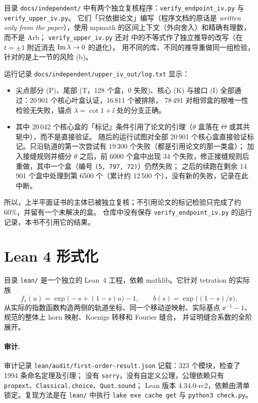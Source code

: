 目录 \texttt{docs/independent/} 中有两个独立复核程序：\texttt{verify\_\allowbreak{}endpoint\_\allowbreak{}iv.py} 与 \texttt{verify\_\allowbreak{}upper\_\allowbreak{}iv.py}。
它们「只依据论文」编写（程序文档的原话是 \emph{written only from the paper}），使用 mpmath 的区间上下文（外向舍入）和精确有理数，而不是 Arb；
\texttt{verify\_\allowbreak{}upper\_\allowbreak{}iv.py} 还对 \cite{KneserPaper} 中的不等式作了独立推导的改写（在 $t=\pm1$ 附近消去 $\operatorname{Im}\lambda\to0$ 的退化）。
用不同的库、不同的推导重做同一组检验，针对的是上一节的风险 (b)。

运行记录 \texttt{docs/independent/upper\_\allowbreak{}iv\_\allowbreak{}out/log.txt} 显示：
\begin{itemize}
\item 尖点部分 (P)、尾部 (T，128 个盒，0 失败)、核心 (K) 与接口 (I) 全部通过：20\,901 个核心叶盒认证，16\,811 个被排除，
  78\,491 对相邻盒的根唯一性检验无失败，锚点 $\lambda=\cot1+\ii$ 处的分支正确。
\item 其中 20\,042 个核心盒的「标记」条件引用了论文的引理（$\theta$ 盒落在 $\Theta$ 或其共轭中），而不是直接验证。
  随后的运行试图对全部 20\,901 个核心盒直接验证标记。只沿轨道的第一次尝试有 19\,300 个失败（都是引用论文的那一类盒）；
  加入接缝规则并细分 $\theta$ 之后，前 6000 个盒中出现 34 个失败，修正接缝规则后重做，其中一个盒（编号 \texttt{(5, 797, 72)}）仍然失败；
  之后的续跑在剩余 14\,901 个盒中处理到第 6500 个（累计约 12\,500 个），没有新的失败，记录在此中断。
\end{itemize}
所以，上半平面证书的主体已被独立复核；不引用论文的标记检验只完成了约 60\%，并留有一个未解决的盒。
仓库中没有保存 \texttt{verify\_\allowbreak{}endpoint\_\allowbreak{}iv.py} 的运行记录，本书不引用它的结果。

\section{Lean 4 形式化}\label{ch11:sec:lean}

目录 \texttt{lean/} 是一个独立的 Lean~4 工程\cite{Moura2021Lean4}，依赖 mathlib\cite{mathlib2020}。它针对 tetration 的实际族
\[
 f_s(u)=\exp\bigl(-s+(1-s)u\bigr)-1,\qquad b(s)=\exp\bigl((1-s)/\ee\bigr),
\]
从实际的指数函数构造两侧的轨道坐标、同一个移动逆映射、实际基点 $\ee^{-1}-1$、规范的整体上 horn 映射、Koenigs 转移和 Fourier 缝合，
并证明缝合系数的全阶展开。

\paragraph{审计.} 审计记录 \texttt{lean/audit/first-order-result.json} 记载：323 个模块，检查了 1994 条命名定理及引理；
没有 \texttt{sorry}，没有自定义公理，公理依赖只有 \texttt{propext}、\texttt{Classical.choice}、\texttt{Quot.sound}；
Lean 版本 4.34.0-rc2，依赖由清单锁定。复现方法是在 \texttt{lean/} 中执行 \texttt{lake exe cache get} 与 \texttt{python3 check.py}。

